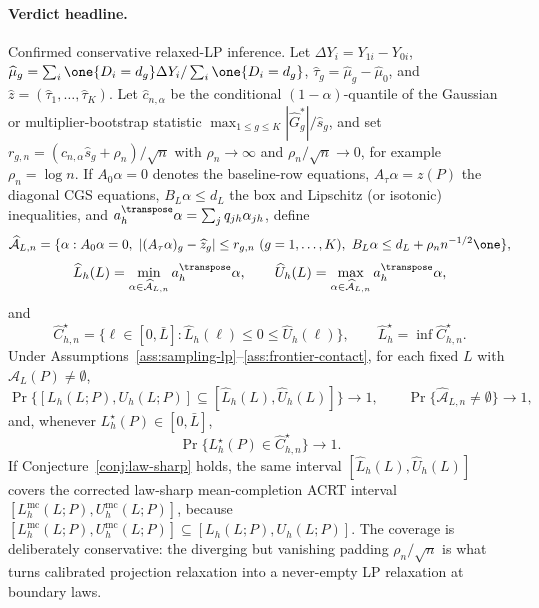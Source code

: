 \begin{theorem}\label{thm:plugin-inference}
\paragraph{Verdict headline.}
Confirmed conservative relaxed-LP inference. Let \(\Delta Y_i=Y_{1i}-Y_{0i}\), \(\widehat\mu_g=\sum_i\one\{D_i=d_g\}\Delta Y_i/\sum_i\one\{D_i=d_g\}\), \(\widehat\tau_g=\widehat\mu_g-\widehat\mu_0\), and \(\widehat z=(\widehat\tau_1,\ldots,\widehat\tau_K)\). Let \(\widehat c_{n,\alpha}\) be the conditional \((1-\alpha)\)-quantile of the Gaussian or multiplier-bootstrap statistic \(\max_{1\le g\le K}|\widehat G_g^\ast|/\widehat s_g\), and set \(r_{g,n}=(\widehat c_{n,\alpha}\widehat s_g+\rho_n)/\sqrt n\) with \(\rho_n\to\infty\) and \(\rho_n/\sqrt n\to0\), for example \(\rho_n=\log n\). If \(A_0\alpha=0\) denotes the baseline-row equations, \(A_\tau\alpha=z(P)\) the diagonal CGS equations, \(B_L\alpha\le d_L\) the box and Lipschitz (or isotonic) inequalities, and \(a_h^\transpose\alpha=\sum_j q_{jh}\alpha_{jh}\), define
\[
  \widehat{\mathcal A}_{L,n}
  =
  \{\alpha:A_0\alpha=0,\ |(A_\tau\alpha)_g-\widehat z_g|\le r_{g,n}\ (g=1,\ldots,K),\ B_L\alpha\le d_L+\rho_n n^{-1/2}\one\},
\]
\[
  \widehat L_h(L)=\min_{\alpha\in\widehat{\mathcal A}_{L,n}}a_h^\transpose\alpha,
  \qquad
  \widehat U_h(L)=\max_{\alpha\in\widehat{\mathcal A}_{L,n}}a_h^\transpose\alpha,
\]
and
\[
  \widehat C_{h,n}^\star=\{\ell\in[0,\bar L]:\widehat L_h(\ell)\le0\le\widehat U_h(\ell)\},
  \qquad
  \widehat L_h^\star=\inf \widehat C_{h,n}^\star .
\]
Under Assumptions~\ref{ass:sampling-lp}--\ref{ass:frontier-contact}, for each fixed \(L\) with \(\mathcal A_L(P)\ne\emptyset\),
\[
  \Pr\{[L_h(L;P),U_h(L;P)]\subseteq[\widehat L_h(L),\widehat U_h(L)]\}\to1,
  \qquad
  \Pr\{\widehat{\mathcal A}_{L,n}\ne\emptyset\}\to1,
\]
and, whenever \(L_h^\star(P)\in[0,\bar L]\),
\[
  \Pr\{L_h^\star(P)\in\widehat C_{h,n}^\star\}\to1 .
\]
If Conjecture~\ref{conj:law-sharp} holds, the same interval
\([\widehat L_h(L),\widehat U_h(L)]\) covers the corrected law-sharp
mean-completion ACRT interval
\([L_h^{\mathrm{mc}}(L;P),U_h^{\mathrm{mc}}(L;P)]\), because
\([L_h^{\mathrm{mc}}(L;P),U_h^{\mathrm{mc}}(L;P)]\subseteq[L_h(L;P),U_h(L;P)]\).  The coverage is deliberately conservative: the diverging but vanishing padding \(\rho_n/\sqrt n\) is what turns calibrated projection relaxation into a never-empty LP relaxation at boundary laws.

\end{theorem}
